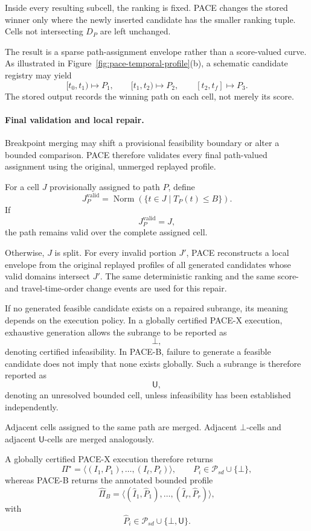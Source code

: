 \documentclass[a4paper,fleqn]{cas-dc}
\begin{document}
Inside every resulting subcell, the ranking is fixed. PACE changes the stored
winner only where the newly inserted candidate has the smaller ranking tuple.
Cells not intersecting \(D_P\) are left unchanged.

The result is a sparse path-assignment envelope rather than a score-valued
curve. As illustrated in Figure~\ref{fig:pace-temporal-profile}(b), a schematic
candidate registry may yield
\[
[t_0,t_1)\mapsto P_1,
\qquad
[t_1,t_2)\mapsto P_2,
\qquad
[t_2,t_f]\mapsto P_3.
\]
The stored output records the winning path on each cell, not merely its score.

\paragraph{Final validation and local repair.}
Breakpoint merging may shift a provisional feasibility boundary or alter a
bounded comparison. PACE therefore validates every final path-valued
assignment using the original, unmerged replayed profile.

For a cell \(J\) provisionally assigned to path \(P\), define
\[
J_P^{\mathrm{valid}}
=
\operatorname{Norm}
\left(
\{t\in J\mid T_P(t)\leq B\}
\right).
\]
If
\[
J_P^{\mathrm{valid}}=J,
\]
the path remains valid over the complete assigned cell.

Otherwise, \(J\) is split. For every invalid portion \(J'\), PACE reconstructs
a local envelope from the original replayed profiles of all generated
candidates whose valid domains intersect \(J'\). The same deterministic
ranking and the same score- and travel-time-order change events are used for
this repair.

If no generated feasible candidate exists on a repaired subrange, its meaning
depends on the execution policy. In a globally certified PACE-X execution,
exhaustive generation allows the subrange to be reported as
\[
\bot,
\]
denoting certified infeasibility. In PACE-B, failure to generate a feasible
candidate does not imply that none exists globally. Such a subrange is
therefore reported as
\[
\mathsf U,
\]
denoting an unresolved bounded cell, unless infeasibility has been established
independently.

Adjacent cells assigned to the same path are merged. Adjacent
\(\bot\)-cells and adjacent \(\mathsf U\)-cells are merged analogously.

A globally certified PACE-X execution therefore returns
\[
\Pi^\star
=
\langle
(I_1,P_1),\ldots,(I_\ell,P_\ell)
\rangle,
\qquad
P_i\in\mathcal P_{sd}\cup\{\bot\},
\]
whereas PACE-B returns the annotated bounded profile
\[
\widehat\Pi_B
=
\langle
(\widehat I_1,\widehat P_1),\ldots,
(\widehat I_r,\widehat P_r)
\rangle,
\]
with
\[
\widehat P_i
\in
\mathcal P_{sd}\cup\{\bot,\mathsf U\}.
\]
\end{document}
